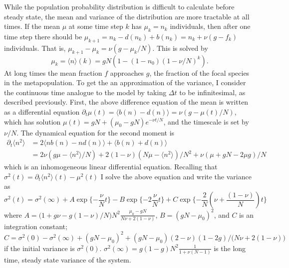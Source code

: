 While the population probability distribution is difficult to calculate before steady state, the mean and variance of the distribution are more tractable at all times. 
If the mean $\mu$ at some time step $k$ has $\mu_k=n_k$ individuals, then after one time step there should be $\mu_{k+1}= n_k - d(n_k) + b(n_k) = n_k + \nu(g-f_k)$ individuals. 
That is, $\mu_{k+1}-\mu_k = \nu(g-\mu_k/N)$. 
This is solved by 
\begin{equation}
 \mu_k = \langle n\rangle(k) = g N \left( 1 - (1-n_0)(1-\nu/N)^k\right).
\end{equation}
At long times the mean fraction $f$ approaches $g$, the fraction of the focal species in the metapopulation. 
To get the an approximation of the variance, I consider the continuous time analogue to the model by taking $\Delta t$ to be infinitesimal, as described previously. 
First, the above difference equation of the mean is written as a differential equation $\partial_t\mu(t) = \langle b(n)-d(n)\rangle = \nu\left(g-\mu(t)/N\right)$, which has solution $\mu(t) = g N  + (\mu_0-g N)e^{-\nu t/N}$, and the timescale is set by $\nu/N$. 
The dynamical equation for the second moment is
\begin{align*}
 \partial_t\langle n^2\rangle &= 2\langle n b(n) - n d(n)\rangle + \langle b(n) + d(n)\rangle \\
                              &= 2\nu \left( g \mu - \langle n^2\rangle/N\right) + 2(1-\nu)\left(N\mu-\langle n^2\rangle\right)/N^2 + \nu(\mu + g N - 2 \mu g)/N
\end{align*}
which is an inhomogeneous linear differential equation. 
Recalling that $\sigma^2(t) = \partial_t\langle n^2\rangle(t) - \mu^2(t)$ I solve the above equation and write the variance as
\begin{equation*}
 \sigma^2(t) = \sigma^2(\infty) + A\exp\{-\frac{\nu}{N}t\} - B\exp\{-2\frac{\nu}{N}t\} + C\exp\{-\frac{2}{N}\left(\nu+\frac{(1-\nu)}{N}\right)t\}
\end{equation*}
where $A=\big(1+g\nu-g(1-\nu)/N\big)N^2\frac{\mu_0-gN}{N\nu+2(1-\nu)}$, $B=(gN-\mu_0)^2$, and $C$ is an integration constant; $C = \sigma^2(0) - \sigma^2(\infty) + (gN-\mu_0)^2 + (gN-\mu_0)(2-\nu)(1-2g)/\big(N\nu+2(1-\nu)\big)$ if the initial variance is $\sigma^2(0)$. 
$\sigma^2(\infty) = g(1-g) N^2\frac{1}{1+\nu(N-1)}$ is the long time, steady state variance of the system. 


